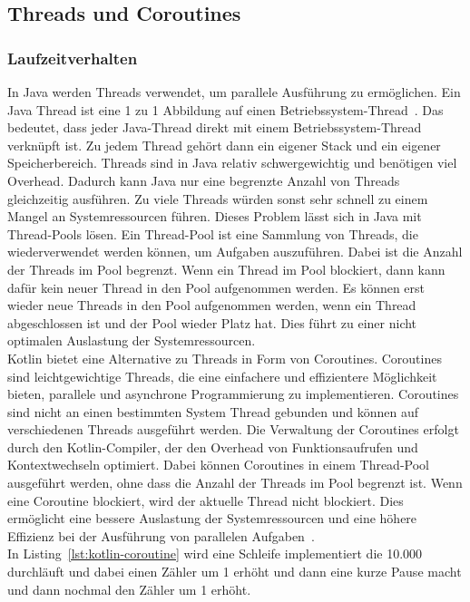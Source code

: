 \documentclass[11pt]{article}
\begin{document}
    \subsection{Threads und Coroutines}

    \subsubsection{Laufzeitverhalten}
    In Java werden Threads verwendet, um parallele Ausführung zu ermöglichen.
    Ein Java Thread ist eine 1 zu 1 Abbildung auf einen Betriebssystem-Thread~\cite[940]{insel}.
    Das bedeutet, dass jeder Java-Thread direkt mit einem Betriebssystem-Thread verknüpft ist.
    Zu jedem Thread gehört dann ein eigener Stack und ein eigener Speicherbereich.
    Threads sind in Java relativ schwergewichtig und benötigen viel Overhead.
    Dadurch kann Java nur eine begrenzte Anzahl von Threads gleichzeitig ausführen.
    Zu viele Threads würden sonst sehr schnell zu einem Mangel an Systemressourcen führen.
    Dieses Problem lässt sich in Java mit Thread-Pools lösen.
    Ein Thread-Pool ist eine Sammlung von Threads, die wiederverwendet werden können, um Aufgaben auszuführen.
    Dabei ist die Anzahl der Threads im Pool begrenzt.
    Wenn ein Thread im Pool blockiert, dann kann dafür kein neuer Thread in den Pool aufgenommen werden.
    Es können erst wieder neue Threads in den Pool aufgenommen werden, wenn ein Thread abgeschlossen ist und der Pool wieder Platz hat.
    Dies führt zu einer nicht optimalen Auslastung der Systemressourcen.\\
    Kotlin bietet eine Alternative zu Threads in Form von Coroutines.
    Coroutines sind leichtgewichtige Threads, die eine einfachere und effizientere Möglichkeit bieten, parallele und asynchrone Programmierung zu implementieren.
    Coroutines sind nicht an einen bestimmten System Thread gebunden und können auf verschiedenen Threads ausgeführt werden.
    Die Verwaltung der Coroutines erfolgt durch den Kotlin-Compiler, der den Overhead von Funktionsaufrufen und Kontextwechseln optimiert.
    Dabei können Coroutines in einem Thread-Pool ausgeführt werden, ohne dass die Anzahl der Threads im Pool begrenzt ist.
    Wenn eine Coroutine blockiert, wird der aktuelle Thread nicht blockiert.
    Dies ermöglicht eine bessere Auslastung der Systemressourcen und eine höhere Effizienz bei der Ausführung von parallelen Aufgaben~\cite[194]{kotlin-patterns}.
    \\
    In Listing~\ref{lst:kotlin-coroutine} wird eine Schleife implementiert die 10.000 durchläuft und dabei einen Zähler um 1 erhöht und dann eine kurze Pause macht und dann nochmal den Zähler um 1 erhöht.
\end{document}
